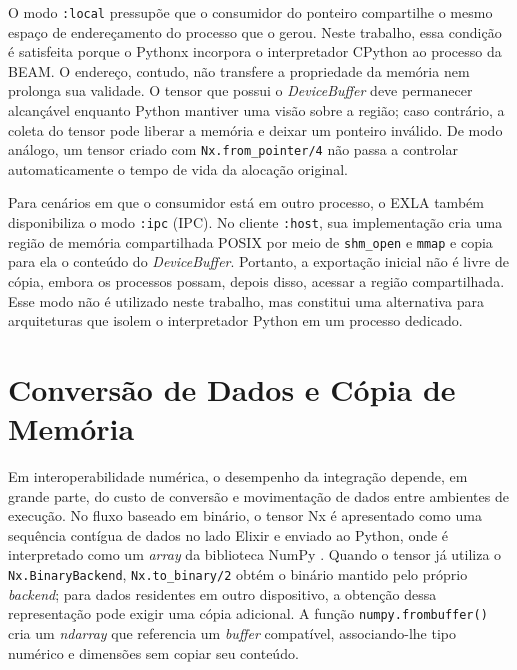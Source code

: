 \begin{sourcecode}[htb]
\caption{Obtenção de um ponteiro de memória para um tensor EXLA}
\label{code:nx-to-pointer}
\end{sourcecode}

O modo \texttt{:local} pressupõe que o consumidor do ponteiro compartilhe o mesmo espaço de endereçamento do processo que o gerou. Neste trabalho, essa condição é satisfeita porque o Pythonx incorpora o interpretador CPython ao processo da \gls{BEAM}. O endereço, contudo, não transfere a propriedade da memória nem prolonga sua validade. O tensor que possui o \textit{DeviceBuffer} deve permanecer alcançável enquanto Python mantiver uma visão sobre a região; caso contrário, a coleta do tensor pode liberar a memória e deixar um ponteiro inválido. De modo análogo, um tensor criado com \texttt{Nx.from\_pointer/4} não passa a controlar automaticamente o tempo de vida da alocação original.

Para cenários em que o consumidor está em outro processo, o \gls{EXLA} também disponibiliza o modo \texttt{:ipc} (\gls{IPC}). No cliente \texttt{:host}, sua implementação cria uma região de memória compartilhada POSIX por meio de \texttt{shm\_open} e \texttt{mmap} e copia para ela o conteúdo do \textit{DeviceBuffer}. Portanto, a exportação inicial não é livre de cópia, embora os processos possam, depois disso, acessar a região compartilhada. Esse modo não é utilizado neste trabalho, mas constitui uma alternativa para arquiteturas que isolem o interpretador Python em um processo dedicado.

\section{Conversão de Dados e Cópia de Memória}\label{sec:conversao-dados}

Em interoperabilidade numérica, o desempenho da integração depende, em grande parte, do custo de conversão e movimentação de dados entre ambientes de execução. No fluxo baseado em binário, o tensor \gls{Nx} é apresentado como uma sequência contígua de dados no lado Elixir e enviado ao Python, onde é interpretado como um \textit{array} da biblioteca NumPy \citep{numpy2024}. Quando o tensor já utiliza o \texttt{Nx.BinaryBackend}, \texttt{Nx.to\_binary/2} obtém o binário mantido pelo próprio \textit{backend}; para dados residentes em outro dispositivo, a obtenção dessa representação pode exigir uma cópia adicional. A função \texttt{numpy.frombuffer()} cria um \textit{ndarray} que referencia um \textit{buffer} compatível, associando-lhe tipo numérico e dimensões sem copiar seu conteúdo.


